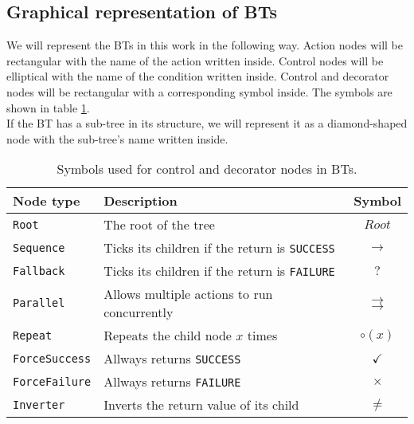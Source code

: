     \subsection{Graphical representation of BTs}
        We will represent the BTs in this work in the following way. Action nodes will be rectangular with the name of the action written inside. Control nodes will be elliptical with the name of the condition written inside. Control and decorator nodes will be rectangular with a corresponding symbol inside. The symbols are shown in table \ref{tab:symbols}.\\
        If the BT has a sub-tree in its structure, we will represent it as a diamond-shaped node with the sub-tree's name written inside.
        \begin{table}[H]
            \centering
            \begin{tabular}{|l|l|c|}
                \hline
                \textbf{Node type} & \textbf{Description} & \textbf{Symbol} \\
                \hline\hline
                \texttt{Root} & The root of the tree & $Root$ \\
                \hline
                \texttt{Sequence} & Ticks its children if the return is \texttt{SUCCESS} & $\to$ \\
                \hline
                \texttt{Fallback} & Ticks its children if the return is \texttt{FAILURE} & $?$ \\
                \hline
                \texttt{Parallel} & Allows multiple actions to run concurrently & $\rightrightarrows$ \\
                \hline
                \texttt{Repeat} & Repeats the child node $x$ times & $\circ(x)$ \\
                \hline
                \texttt{ForceSuccess} & Allways returns \texttt{SUCCESS} & $\checkmark$ \\
                \hline
                \texttt{ForceFailure} & Allways returns \texttt{FAILURE} & $\times$ \\
                \hline
                \texttt{Inverter} & Inverts the return value of its child & $\neq$ \\
                \hline
            \end{tabular}
            \caption{Symbols used for control and decorator nodes in BTs.}
            \label{tab:symbols}
        \end{table}
    
